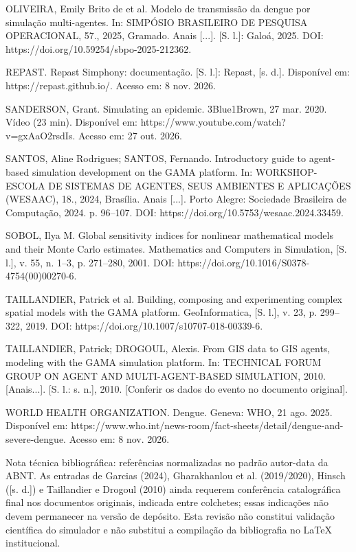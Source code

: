 OLIVEIRA, Emily Brito de et al. Modelo de transmissão da dengue por
simulação multi-agentes. In: SIMPÓSIO BRASILEIRO DE PESQUISA
OPERACIONAL, 57., 2025, Gramado. Anais {[}...{]}. {[}S. l.{]}: Galoá,
2025. DOI: https://doi.org/10.59254/sbpo-2025-212362.

REPAST. Repast Simphony: documentação. {[}S. l.{]}: Repast, {[}s. d.{]}.
Disponível em: https://repast.github.io/. Acesso em: 8 nov. 2026.

SANDERSON, Grant. Simulating an epidemic. 3Blue1Brown, 27 mar. 2020.
Vídeo (23 min). Disponível em:
https://www.youtube.com/watch?v=gxAaO2rsdIs. Acesso em: 27 out. 2026.

SANTOS, Aline Rodrigues; SANTOS, Fernando. Introductory guide to
agent-based simulation development on the GAMA platform. In:
WORKSHOP-ESCOLA DE SISTEMAS DE AGENTES, SEUS AMBIENTES E APLICAÇÕES
(WESAAC), 18., 2024, Brasília. Anais {[}...{]}. Porto Alegre: Sociedade
Brasileira de Computação, 2024. p. 96--107. DOI:
https://doi.org/10.5753/wesaac.2024.33459.

SOBOL, Ilya M. Global sensitivity indices for nonlinear mathematical
models and their Monte Carlo estimates. Mathematics and Computers in
Simulation, {[}S. l.{]}, v. 55, n. 1--3, p. 271--280, 2001. DOI:
https://doi.org/10.1016/S0378-4754(00)00270-6.

TAILLANDIER, Patrick et al. Building, composing and experimenting
complex spatial models with the GAMA platform. GeoInformatica, {[}S.
l.{]}, v. 23, p. 299--322, 2019. DOI:
https://doi.org/10.1007/s10707-018-00339-6.

TAILLANDIER, Patrick; DROGOUL, Alexis. From GIS data to GIS agents,
modeling with the GAMA simulation platform. In: TECHNICAL FORUM GROUP ON
AGENT AND MULTI-AGENT-BASED SIMULATION, 2010. {[}Anais...{]}. {[}S. l.:
s. n.{]}, 2010. {[}Conferir os dados do evento no documento original{]}.

WORLD HEALTH ORGANIZATION. Dengue. Geneva: WHO, 21 ago. 2025. Disponível
em:
https://www.who.int/news-room/fact-sheets/detail/dengue-and-severe-dengue.
Acesso em: 8 nov. 2026.

Nota técnica bibliográfica: referências normalizadas no padrão
autor-data da ABNT. As entradas de Garcias (2024), Gharakhanlou et al.
(2019/2020), Hinsch ({[}s. d.{]}) e Taillandier e Drogoul (2010) ainda
requerem conferência catalográfica final nos documentos originais,
indicada entre colchetes; essas indicações não devem permanecer na
versão de depósito. Esta revisão não constitui validação científica do
simulador e não substitui a compilação da bibliografia no LaTeX
institucional.

